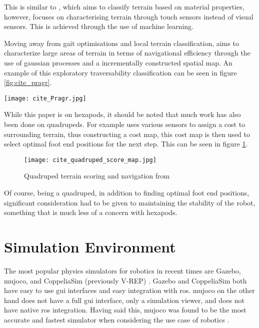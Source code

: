     This is similar to \cite{Xu2023Learning}, which aims to
    classify terrain based on material properties, however, \cite{Xu2023Learning} focuses on characterising terrain through touch sensors instead of visual sensors.
    This is achieved through the use of machine learning.
    
    Moving away from gait optimisations and local terrain classification, \cite{Prágr2019Online} aims to characterize
    large areas of terrain in terms of navigational efficiency through the use of gaussian processes and a incrementally constructed spatial map.
    An example of this exploratory traversability classification can be seen in figure \ref{fig:cite_pragr}.

    \vspace{0.5cm}
    \begin{centering}
        \centering
        \texttt{[image: cite\_Pragr.jpg]}
        \label{fig:cite_pragr}
    \end{centering}

    \noindent
    While this paper is on hexapods, it should be noted that much work has also been done on quadrupeds. For example \cite{Mastalli2020Motion} uses various sensors
    to assign a cost to surrounding terrain, thus constructing a cost map, this cost map is then used to select optimal foot end positions for the next step. This can be seen in figure \ref{fig:cite_quadruped_walk}.
    \begin{figure}[h]
        \centering
        \texttt{[image: cite\_quadruped\_score\_map.jpg]}
        \caption{Quadruped terrain scoring and navigation from \cite{Mastalli2020Motion}}
        \label{fig:cite_quadruped_walk}
    \end{figure}
    Of course, being a quadruped, in addition to finding optimal foot end positions, significant consideration had to be given to maintaining the stability of the robot,
    something that is much less of a concern with hexapods.

\section{Simulation Environment} \label{sec:sim_research}

The most popular physics simulators for robotics in recent times are Gazebo, \ac{mujoco},  and CoppeliaSim (previously V-REP) \citep{Collins-2021}. Gazebo and CoppeliaSim both have easy to use \ac{gui} interfaces and easy integration with \ac{ros}. \ac{mujoco} on the other hand does not have a full \ac{gui} interface, only a simulation viewer, and does not have native \ac{ros} integration. Having said this, \ac{mujoco} was found to be the most accurate and fastest simulator when considering the use case of robotics \citep{Erez-2015}.
    

